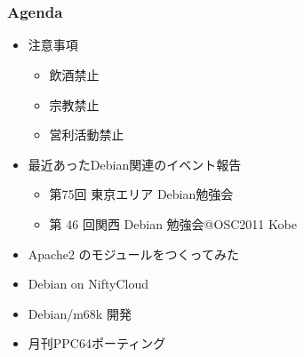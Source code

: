 \frame{\titlepage{}}

\section{}
\begin{frame}
 \frametitle{Agenda}
\begin{minipage}[t]{0.45\hsize}
  \begin{itemize}
  \item 注意事項
	\begin{itemize}
	 \item 飲酒禁止
	 \item 宗教禁止
	 \item 営利活動禁止
	\end{itemize}
   \item 最近あったDebian関連のイベント報告
	\begin{itemize}
	 \item 第75回 東京エリア Debian勉強会
         \item 第 46 回関西 Debian 勉強会@OSC2011 Kobe
	\end{itemize}
 \end{itemize}
\end{minipage} 
\begin{minipage}[t]{0.45\hsize}
 \begin{itemize}
  \item Apache2 のモジュールをつくってみた
  \item Debian on NiftyCloud
  \item Debian/m68k 開発
  \item 月刊PPC64ポーティング
 \end{itemize}
\end{minipage}
\end{frame}

